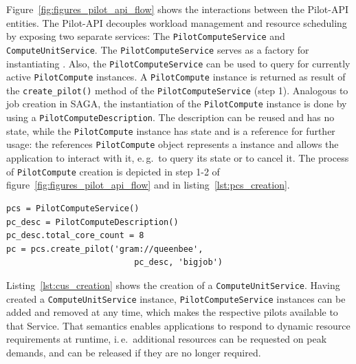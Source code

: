 \documentclass[conference]{IEEEtran}
\begin{document}
Figure~\ref{fig:figures_pilot_api_flow} shows the interactions between the
Pilot-API entities. The Pilot-API decouples
workload management and resource scheduling by exposing two separate services: 
The \texttt{Pilot\-Compute\-Service} and
\texttt{Compute\-Unit\-Service}. 
The \texttt{Pilot\-Compute\-Service} serves as a factory for instantiating \pilots. 
Also, the \texttt{Pilot\-Compute\-Service} can be used to query for currently
active \texttt{Pilot\-Compute} instan\-ces.
A \texttt{Pilot\-Compute} instance is returned as result of the
\texttt{create\_pilot()} method of the \texttt{Pi\-lot\-Compute\-Service} (step 1).
Analogous to job creation in SAGA, the instantiation of the
\texttt{Pilot\-Compute} instance is done by using a
\texttt{Pilot\-ComputeDescription}. The description can be reused and has no
state, while the \texttt{Pilot\-Compute} instance has state and is a reference
for further usage:
the references \texttt{Pilot\-Compute} object represents a \pilot instance and allows the 
application to interact with it, e.\,g.\ to query its state or to cancel 
it. The process of \texttt{Pilot\-Compute} creation is depicted in step 1-2 of 
figure~\ref{fig:figures_pilot_api_flow} and in listing~\ref{lst:pcs_creation}.


\lstset{
language=Python,
frame=single,
captionpos=b,
stringstyle=\ttfamily,
basicstyle=\scriptsize\ttfamily
}

\begin{minipage}{0.45 \textwidth}
\begin{lstlisting}[caption={\I{Creation of a \T{PilotCompute} instance using a \T{Pi\-lot\-Compute\-Description}.}}, label={lst:pcs_creation}]
pcs = PilotComputeService()
pc_desc = PilotComputeDescription()
pc_desc.total_core_count = 8
pc = pcs.create_pilot('gram://queenbee', 
                          pc_desc, 'bigjob')
\end{lstlisting}
\end{minipage}

Listing~\ref{lst:cus_creation} shows the creation of
a \texttt{Compute\-Unit\-Service}.  Having created
a \texttt{Compute\-Unit\-Service} instance, \texttt{Pilot\-Compute\-Service}
instances can be added and removed at any time, which makes the respective pilots available to that Service.  That semantics enables applications to
respond to dynamic resource requirements at runtime, i.\,e.\ additional
resources can be requested on peak demands, and can be released if they are no
longer required.\\
\end{document}
